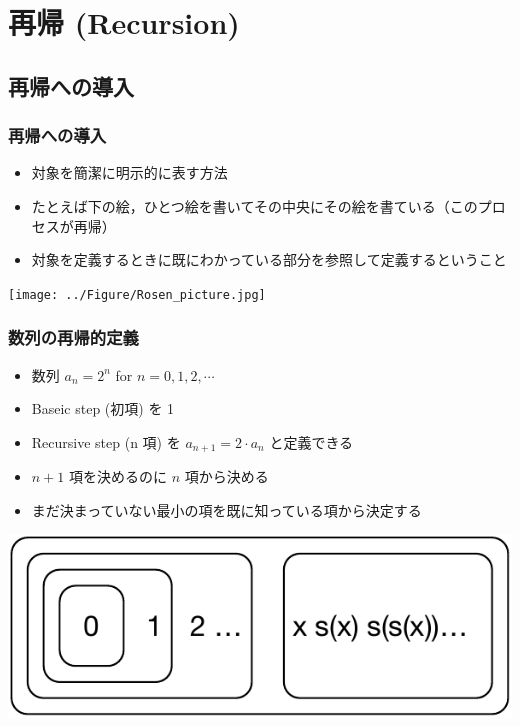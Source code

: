 \section{再帰 (Recursion)}
\subsection{再帰への導入}
\begin{frame}[fragile]
\frametitle{再帰への導入}
  \begin{itemize}
\item 対象を簡潔に明示的に表す方法
\item たとえば下の絵，ひとつ絵を書いてその中央にその絵を書ている（このプロセスが再帰）
\item 対象を定義するときに既にわかっている部分を参照して定義するということ

  \end{itemize}
  \begin{center}
\texttt{[image: ../Figure/Rosen\_picture.jpg]}
  \end{center}
\end{frame}
\begin{frame}[fragile]
\frametitle{数列の再帰的定義}
  \begin{itemize}
\item 数列 \(a_n=2^n\) for \(n=0,1,2,\cdots\)
\item Baseic step (初項) を 1
\item Recursive step (n 項) を \(a_{n+1}=2\cdot a_n\) と定義できる
\item \(n+1\) 項を決めるのに \(n\) 項から決める
\item まだ決まっていない最小の項を既に知っている項から決定する
  \end{itemize}
  \begin{center}
\includegraphics[scale=0.5]{./Figure/elementaryCS-2nd-figRecursion.pdf}
  \end{center}
\end{frame}
